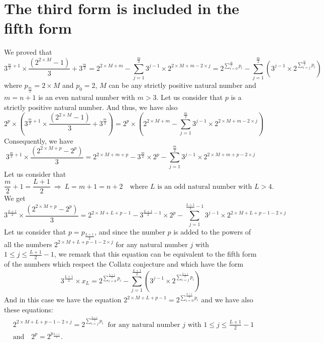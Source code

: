 \documentclass[11pt,a4paper]{article}
\newcommand{\Pf}[4]{2^{\sum_{#4=0}^{#1}#3_{#4}}-\sum_{j=1}^{#2}\left(3^{j-1}\times 2^{\sum_{#4=j}^{#1}#3_{#4}}\right)}
\theoremstyle{definition}
\begin{document}
\section{The third form is included in the fifth form}
We proved that
\begin{equation}
3^{\frac m2+1}\times\frac{\left(2^{2\times M}-1\right)}{3}+3^{\frac m2}
=2^{2\times M+m}-\sum_{j=1}^{\frac m2}3^{j-1}\times 2^{2\times M+m-2\times j}
=\Pf{\frac m2}{\frac m2}{p}{i}
\end{equation}
where $p_{\frac m2}=2\times M$ and $p_0=2$, $M$ can be any strictly positive natural number
and $m=n+1$ is an even natural number with $m>3$. Let us consider that $p$ is a strictly
positive natural number. And thus, we have also
\begin{equation}
2^{p}\times\left(3^{\frac m2+1}\times\frac{\left(2^{2\times M}-1\right)}{3}+3^{\frac m2}\right)
=2^{p}\times\left(2^{2\times M+m}-\sum_{j=1}^{\frac m2}3^{j-1}\times 2^{2\times M+m-2\times j}\right)
\end{equation}
Consequently, we have
\begin{equation}
3^{\frac m2+1}\times\frac{\left(2^{2\times M+p}-2^{p}\right)}{3}
=2^{2\times M+m+p}-3^{\frac m2}\times 2^{p}-\sum_{j=1}^{\frac m2}3^{j-1}\times 2^{2\times M+m+p-2\times j}
\end{equation}
Let us consider that
\begin{equation}
\frac m2+1=\frac{L+1}{2}\ \Rightarrow\ L=m+1=n+2\quad\text{where }L\text{ is an odd natural number with }L>4.
\end{equation}
We get
\begin{equation}
3^{\frac{L+1}{2}}\times\frac{\left(2^{2\times M+p}-2^{p}\right)}{3}
=2^{2\times M+L+p-1}-3^{\frac{L+1}{2}-1}\times 2^{p}-\sum_{j=1}^{\frac{L+1}{2}-1}3^{j-1}\times 2^{2\times M+L+p-1-2\times j}
\end{equation}
Let us consider that $p=p_{\frac{L+1}{2}}$, and since the number $p$ is added to the powers of
all the numbers $2^{2\times M+L+p-1-2\times j}$ for any natural number $j$ with
$1\le j\le\frac{L+1}{2}-1$, we remark that this equation can be equivalent to the fifth form
of the numbers which respect the Collatz conjecture and which have the form
\begin{equation}
3^{\frac{L+1}{2}}\times x_L=\Pf{\frac{L+1}{2}}{\frac{L+1}{2}}{p}{i}
\end{equation}
And in this case we have the equation $2^{2\times M+L+p-1}=2^{\sum_{i=0}^{\frac{L+1}{2}}p_i}$
and we have also these equations:
\begin{equation}
\begin{split}
&2^{2\times M+L+p-1-2\times j}=2^{\sum_{i=j}^{\frac{L+1}{2}}p_i}\ \text{ for any natural number }j\text{ with }1\le j\le\frac{L+1}{2}-1\\
&\text{and}\quad 2^{p}=2^{p_{\frac{L+1}{2}}}.
\end{split}
\end{equation}
\end{document}
